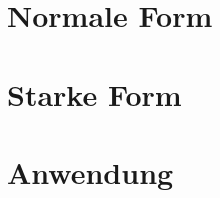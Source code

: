 \documentclass{article}
\begin{document}
\section{Normale Form}
\section{Starke Form}
\section{Anwendung}
\end{document}

